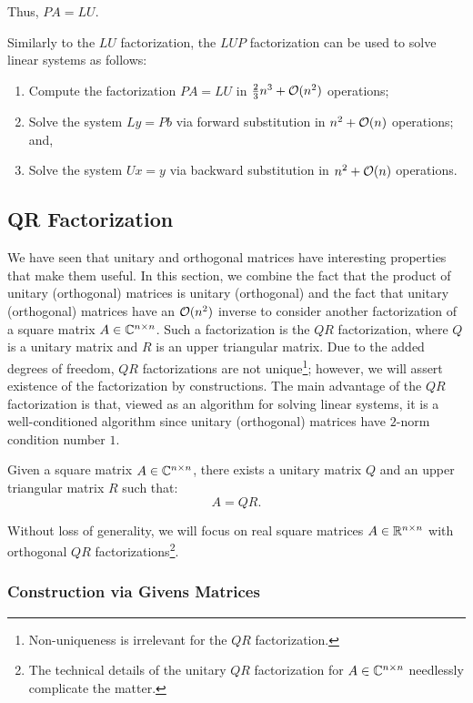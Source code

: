 \begin{example}
\[\]
Thus, $PA = LU$.
\end{example}

Similarly to the $LU$ factorization, the $LUP$ factorization can be used to solve linear systems as follows:
\begin{enumerate}
\item Compute the factorization $PA=LU$ in $\frac{2}{3}n^3+\mathcal{O}(n^2)$ operations;
\item Solve the system $Ly = Pb$ via forward substitution in $n^2+\mathcal{O}(n)$ operations; and,
\item Solve the system $Ux = y$ via backward substitution in $n^2+\mathcal{O}(n)$ operations.
\end{enumerate}

\subsection{QR Factorization}

We have seen that unitary and orthogonal matrices have interesting properties that make them useful. In this section, we combine the fact that the product of unitary (orthogonal) matrices is unitary (orthogonal) and the fact that unitary (orthogonal) matrices have an $\mathcal{O}(n^2)$ inverse to consider another factorization of a square matrix $A\in\mathbb{C}^{n\times n}$. Such a factorization is the $QR$ factorization, where $Q$ is a unitary matrix and $R$ is an upper triangular matrix. Due to the added degrees of freedom, $QR$ factorizations are not unique\footnote{Non-uniqueness is irrelevant for the $QR$ factorization.}; however, we will assert existence of the factorization by constructions. The main advantage of the $QR$ factorization is that, viewed as an algorithm for solving linear systems, it is a well-conditioned algorithm since unitary (orthogonal) matrices have $2$-norm condition number $1$.
\begin{theorem}
Given a square matrix $A\in\mathbb{C}^{n\times n}$, there exists a unitary matrix $Q$ and an upper triangular matrix $R$ such that:
\[
A = QR.
\]
\end{theorem}
Without loss of generality, we will focus on real square matrices $A\in\mathbb{R}^{n\times n}$ with orthogonal $QR$ factorizations\footnote{The technical details of the unitary $QR$ factorization for $A\in\mathbb{C}^{n\times n}$ needlessly complicate the matter.}.

\subsubsection{Construction via Givens Matrices}

